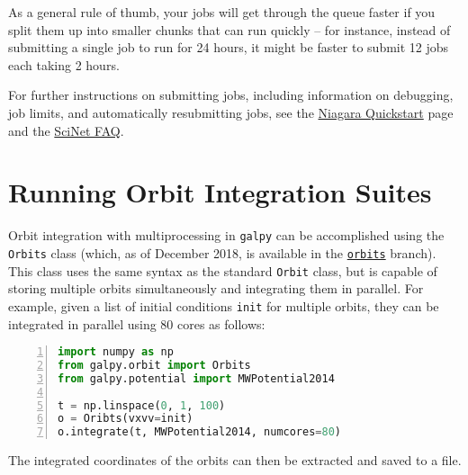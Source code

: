 \documentclass[12pt]{article}
\begin{document}
As a general rule of thumb, your jobs will get through the queue faster if you split them up into smaller chunks that can run quickly -- for instance, instead of submitting a single job to run for 24 hours, it might be faster to submit 12 jobs each taking 2 hours.

For further instructions on submitting jobs, including information on debugging, job limits, and automatically resubmitting jobs, see the \href{https://docs.scinet.utoronto.ca/index.php/Niagara_Quickstart}{Niagara Quickstart} page and the \href{https://docs.scinet.utoronto.ca/index.php/FAQ}{SciNet FAQ}.
\section{Running Orbit Integration Suites}
Orbit integration with multiprocessing in \texttt{galpy} can be accomplished using the \texttt{Orbits} class (which, as of December 2018, is available in the \href{https://github.com/jobovy/galpy/tree/orbits}{\texttt{orbits}} branch). This class uses the same syntax as the standard \texttt{Orbit} class, but is capable of storing multiple orbits simultaneously and integrating them in parallel. For example, given a list of initial conditions \texttt{init} for multiple orbits, they can be integrated in parallel using 80 cores as follows:
\begin{lstlisting}[language=python, numbers=left]
import numpy as np
from galpy.orbit import Orbits
from galpy.potential import MWPotential2014

t = np.linspace(0, 1, 100)
o = Oribts(vxvv=init)
o.integrate(t, MWPotential2014, numcores=80)
\end{lstlisting}
The integrated coordinates of the orbits can then be extracted and saved to a file.
\end{document}
